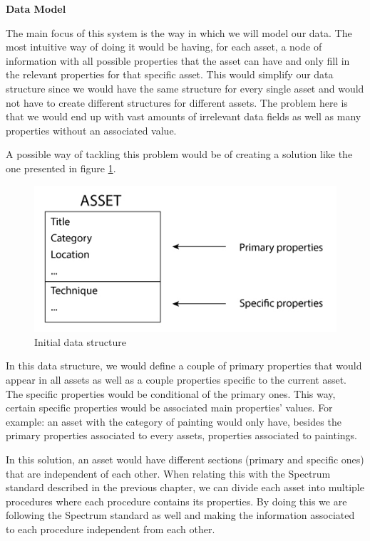 \vspace{4mm}
\textbf{Data Model}
\vspace{2mm}

The main focus of this system is the way in which we will model our data. The most intuitive way of doing it would be having, for each asset, a node of information with all possible properties that the asset can have and only fill in the relevant properties for that specific asset. This would simplify our data structure since we would have the same structure for every single asset and would not have to create different structures for different assets. The problem here is that we would end up with vast amounts of irrelevant data fields as well as many properties without an associated value. 

A possible way of tackling this problem would be of creating a solution like the one presented in figure \ref{dataStructure1}.

\begin{figure}[h!]
    \centering
    \includegraphics[scale=0.35]{images/Architecture/Data-structure-1.jpg}
    \caption[Data structure 1]{Initial data structure}
    \label{dataStructure1}
\end{figure}

In this data structure, we would define a couple of primary properties that would appear in all assets as well as a couple properties specific to the current asset. The specific properties would be conditional of the primary ones. This way, certain specific properties would be associated main properties' values. For example: an asset with the category of painting would only have, besides the primary properties associated to every assets, properties associated to paintings.

In this solution, an asset would have different sections (primary and specific ones) that are independent of each other. When relating this with the Spectrum standard \cite{CollectionsTrust2009TheProcedure} described in the previous chapter, we can divide each asset into multiple procedures where each procedure contains its properties. By doing this we are following the Spectrum standard as well and making the information associated to each procedure independent from each other.

